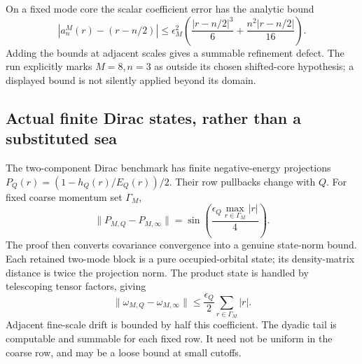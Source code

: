 On a fixed mode core the scalar coefficient error has the analytic bound
\[
 \left|a_n^M(r)-(r-n/2)\right|\le\epsilon_M^2
 \left(\frac{|r-n/2|^3}{6}+\frac{n^2|r-n/2|}{16}\right).
\]
Adding the bounds at adjacent scales gives a summable refinement defect.
The run explicitly marks $M=8,n=3$ as outside its chosen shifted-core
hypothesis; a displayed bound is not silently applied beyond its domain.

\subsection{Actual finite Dirac states, rather than a substituted sea}

The two-component Dirac benchmark has finite negative-energy projections
$P_Q(r)=(1-h_Q(r)/E_Q(r))/2$. Their row pullbacks change with $Q$.
For fixed coarse momentum set $\Gamma_M$,
\[
 \|P_{M,Q}-P_{M,\infty}\|
   =\sin\!\left(\frac{\epsilon_Q\max_{r\in\Gamma_M}|r|}{4}\right).
\]
The proof then converts covariance convergence into a genuine state-norm
bound. Each retained two-mode block is a pure occupied-orbital state;
its density-matrix distance is twice the projection norm. The product
state is handled by telescoping tensor factors, giving
\[
 \|\omega_{M,Q}-\omega_{M,\infty}\|
   \le\frac{\epsilon_Q}{2}\sum_{r\in\Gamma_M}|r|.
\]
Adjacent fine-scale drift is bounded by half this coefficient. The dyadic
tail is computable and summable for each fixed row. It need not be uniform
in the coarse row, and may be a loose bound at small cutoffs.

